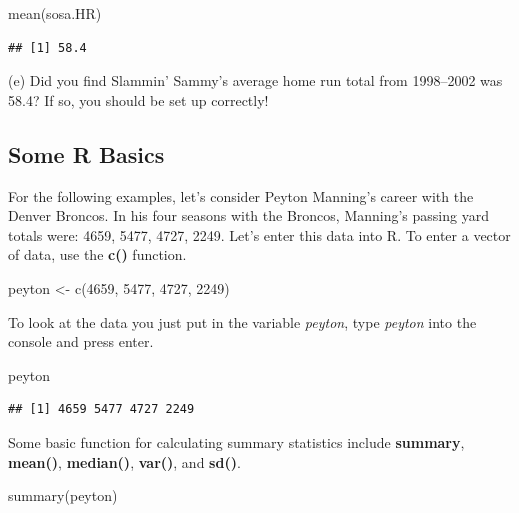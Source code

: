 \documentclass[
  11pt,
]{book}
\newenvironment{Shaded}{\begin{snugshade}}{\end{snugshade}}
\newcommand{\DecValTok}[1]{\textcolor[rgb]{0.00,0.00,0.81}{#1}}
\newcommand{\FunctionTok}[1]{\textcolor[rgb]{0.00,0.00,0.00}{#1}}
\newcommand{\NormalTok}[1]{#1}
\newcommand{\OtherTok}[1]{\textcolor[rgb]{0.56,0.35,0.01}{#1}}
\theoremstyle{definition}
\theoremstyle{definition}
\theoremstyle{definition}
\theoremstyle{definition}
\theoremstyle{remark}
\begin{document}
\begin{Shaded}
\begin{Highlighting}[]
\FunctionTok{mean}\NormalTok{(sosa.HR)}
\end{Highlighting}
\end{Shaded}

\begin{verbatim}
## [1] 58.4
\end{verbatim}

\noindent (e) Did you find Slammin' Sammy's average home run total from 1998--2002 was 58.4? If so, you should be set up correctly!

\hypertarget{some-r-basics}{%
\subsection{Some R Basics}\label{some-r-basics}}

For the following examples, let's consider Peyton Manning's career with the Denver Broncos. In his four seasons with the Broncos, Manning's passing yard totals were: 4659, 5477, 4727, 2249. Let's enter this data into R. To enter a vector of data, use the \textbf{c()} function.

\begin{Shaded}
\begin{Highlighting}[]
\NormalTok{peyton }\OtherTok{\textless{}{-}} \FunctionTok{c}\NormalTok{(}\DecValTok{4659}\NormalTok{, }\DecValTok{5477}\NormalTok{, }\DecValTok{4727}\NormalTok{, }\DecValTok{2249}\NormalTok{)}
\end{Highlighting}
\end{Shaded}

To look at the data you just put in the variable \emph{peyton}, type \emph{peyton} into the console and press enter.

\begin{Shaded}
\begin{Highlighting}[]
\NormalTok{peyton}
\end{Highlighting}
\end{Shaded}

\begin{verbatim}
## [1] 4659 5477 4727 2249
\end{verbatim}

Some basic function for calculating summary statistics include \textbf{summary}, \textbf{mean()}, \textbf{median()}, \textbf{var()}, and \textbf{sd()}.

\begin{Shaded}
\begin{Highlighting}[]
\FunctionTok{summary}\NormalTok{(peyton)}
\end{Highlighting}
\end{Shaded}
\end{document}
